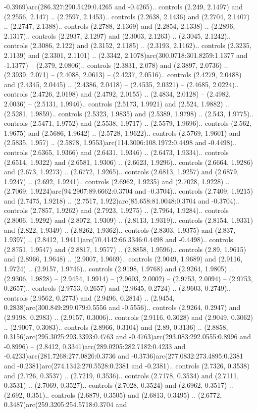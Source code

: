 -0.3969)arc(286.327:290.5429:0.4265 and -0.4265).. controls (2.249, 2.1497) and (2.2556, 2.147) .. (2.2597, 2.1453).. controls (2.2638, 2.1436) and (2.2704, 2.1407) .. (2.2747, 2.1388).. controls (2.2788, 2.1369) and (2.2854, 2.1338) .. (2.2896, 2.1317).. controls (2.2937, 2.1297) and (2.3003, 2.1263) .. (2.3045, 2.1242).. controls (2.3086, 2.122) and (2.3152, 2.1185) .. (2.3193, 2.1162).. controls (2.3235, 2.1139) and (2.3301, 2.1101) .. (2.3342, 2.1078)arc(300.0718:301.8259:1.1377 and -1.1377) -- (2.379, 2.0806).. controls (2.3831, 2.078) and (2.3897, 2.0736) .. (2.3939, 2.071) -- (2.4088, 2.0613) -- (2.4237, 2.0516).. controls (2.4279, 2.0488) and (2.4345, 2.0445) .. (2.4386, 2.0418) -- (2.4535, 2.0321) -- (2.4685, 2.0224).. controls (2.4726, 2.0198) and (2.4792, 2.0155) .. (2.4834, 2.0128) -- (2.4982, 2.0036) -- (2.5131, 1.9946).. controls (2.5173, 1.9921) and (2.524, 1.9882) .. (2.5281, 1.9859).. controls (2.5323, 1.9835) and (2.5389, 1.9798) .. (2.543, 1.9775).. controls (2.5471, 1.9752) and (2.5538, 1.9717) .. (2.5579, 1.9696).. controls (2.562, 1.9675) and (2.5686, 1.9642) .. (2.5728, 1.9622).. controls (2.5769, 1.9601) and (2.5835, 1.957) .. (2.5878, 1.9553)arc(114.3006:108.1972:0.4498 and -0.4498).. controls (2.6365, 1.9366) and (2.6431, 1.9346) .. (2.6473, 1.9334).. controls (2.6514, 1.9322) and (2.6581, 1.9306) .. (2.6623, 1.9296).. controls (2.6664, 1.9286) and (2.673, 1.9273) .. (2.6772, 1.9265).. controls (2.6813, 1.9257) and (2.6879, 1.9247) .. (2.692, 1.9241).. controls (2.6962, 1.9235) and (2.7028, 1.9228) .. (2.7069, 1.9224)arc(94.2907:89.6662:0.3704 and -0.3704).. controls (2.7409, 1.9215) and (2.7475, 1.9218) .. (2.7517, 1.922)arc(85.658:81.0048:0.3704 and -0.3704).. controls (2.7857, 1.9262) and (2.7923, 1.9275) .. (2.7964, 1.9284).. controls (2.8006, 1.9292) and (2.8072, 1.9309) .. (2.8113, 1.9319).. controls (2.8154, 1.9331) and (2.822, 1.9349) .. (2.8262, 1.9362).. controls (2.8303, 1.9375) and (2.837, 1.9397) .. (2.8412, 1.9411)arc(70.4142:66.3346:0.4498 and -0.4498).. controls (2.8751, 1.9547) and (2.8817, 1.9577) .. (2.8858, 1.9596).. controls (2.89, 1.9615) and (2.8966, 1.9648) .. (2.9007, 1.9669).. controls (2.9049, 1.9689) and (2.9116, 1.9724) .. (2.9157, 1.9746).. controls (2.9198, 1.9768) and (2.9264, 1.9805) .. (2.9306, 1.9828) -- (2.9454, 1.9914) -- (2.9603, 2.0002) -- (2.9753, 2.0094) -- (2.9753, 0.2657).. controls (2.9753, 0.2657) and (2.9645, 0.2724) .. (2.9603, 0.2749).. controls (2.9562, 0.2773) and (2.9496, 0.2814) .. (2.9454, 0.2838)arc(300.849:299.079:0.5556 and -0.5556).. controls (2.9264, 0.2947) and (2.9198, 0.2983) .. (2.9157, 0.3006).. controls (2.9116, 0.3028) and (2.9049, 0.3062) .. (2.9007, 0.3083).. controls (2.8966, 0.3104) and (2.89, 0.3136) .. (2.8858, 0.3156)arc(295.3025:293.3393:0.4763 and -0.4763)arc(293.083:292.0555:0.8996 and -0.8996) -- (2.8412, 0.3341)arc(289.0205:282.7182:0.4233 and -0.4233)arc(281.7268:277.0826:0.3736 and -0.3736)arc(277.0832:273.4895:0.2381 and -0.2381)arc(274.1342:270.5528:0.2381 and -0.2381).. controls (2.7326, 0.3538) and (2.726, 0.3537) .. (2.7219, 0.3536).. controls (2.7178, 0.3534) and (2.7111, 0.3531) .. (2.7069, 0.3527).. controls (2.7028, 0.3524) and (2.6962, 0.3517) .. (2.692, 0.351).. controls (2.6879, 0.3505) and (2.6813, 0.3495) .. (2.6772, 0.3487)arc(259.3205:254.5718:0.3704 and 